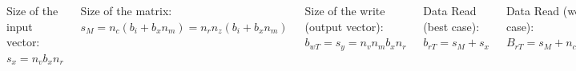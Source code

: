 \documentclass{beamer}
\newcommand{\ceil}[1]{\left\lceil#1\right\rceil}
\begin{document}
\begin{frame}
\begin{columns}
    \includegraphics[width=\linewidth]{slides-figures/PPAM-figures/spmv.pdf}

    Size of the input vector:\\$s_x = n_v b_x n_r$

    Size of the matrix:\\$s_M = n_c (b_i + b_x n_m) = n_r n_z (b_i + b_x n_m)$

    Size of the write (output vector):\\$b_{wT} = s_y = n_v n_m b_x n_r$

    Data Read (best case):\\$b_{rT} = s_M + s_x$
    
    Data Read (worst case):\\$B_{rT} = s_M + n_c cl \ceil{\frac{n_vb_x}{cl}}$

    Number of floating point operations:\\$O = 2 n_v n_m n_c = 2 n_v n_m n_z n_r$

    Intensity (Best case):\\
    $I_b = \frac{O}{b_T+ b_{wT}}$
    
    Intensity (Worst case):\\
    $I_w = \frac{O}{B_T+ b_{wT}}$
  \end{columns}
\end{frame}
\end{document}
